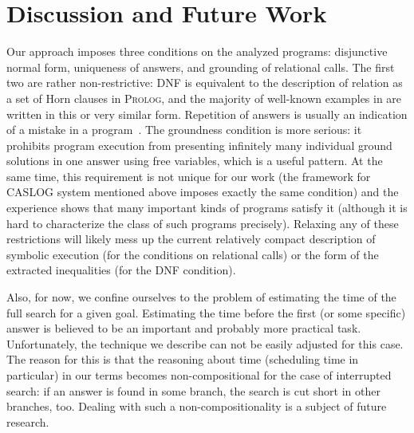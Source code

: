 \section{Discussion and Future Work}
\label{sec:discussion}

Our approach imposes three conditions on the analyzed programs: disjunctive normal form, uniqueness of answers, and grounding of relational calls.
The first two are rather non-restrictive: DNF is equivalent to the description of relation as a set of Horn clauses in \textsc{Prolog},
and the majority of well-known examples in \mK are written in this or very similar form. Repetition of answers is usually an indication
of a mistake in a program~\cite{WillsThesis}. The groundness condition is more serious: it prohibits program execution from presenting infinitely
many individual ground solutions in one answer using free variables, which is a useful pattern. At the same time, this requirement is
not unique for our work (the framework for \textsc{CASLOG} system mentioned above imposes exactly the same condition) and the experience
shows that many important kinds of programs satisfy it (although it is hard to characterize the class of such programs precisely).
Relaxing any of these restrictions will likely mess up the current relatively compact description of symbolic execution (for
the conditions on relational calls) or the form of the extracted inequalities (for the DNF condition).

Also, for now, we confine ourselves to the problem of estimating the time of the full search for a given goal. Estimating the time before
the first (or some specific) answer is believed to be an important and probably more practical task. Unfortunately, the technique we describe
can not be easily adjusted for this case. The reason for this is that the reasoning about time (scheduling time in particular) in our
terms becomes non-compositional for the case of interrupted search: if an answer is found in some branch, the search is cut short in
other branches, too. Dealing with such a non-compositionality is a subject of future research.



